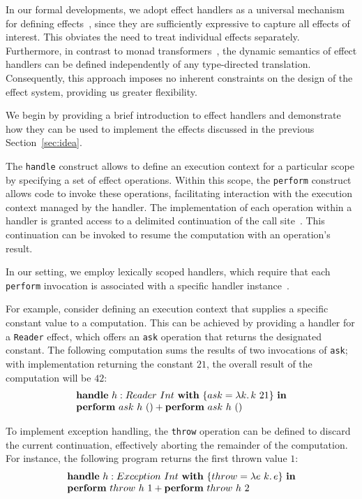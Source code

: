 \documentclass[acmsmall,review,screen]{acmart}
\newcommand{\ap}{~}
\newcommand{\keyword}[1]{\mathbf{#1}}
\begin{document}
In our formal developments, we adopt effect handlers as a universal mechanism for defining effects~\cite{plotkin2003algebraic, plotkin2013handling}, since they are sufficiently expressive to capture all effects of interest.
This obviates the need to treat individual effects separately.
Furthermore, in contrast to monad transformers~\cite{liang1995monad, schrijvers2019monad}, the dynamic semantics of effect handlers can be defined independently of any type-directed translation.
Consequently, this approach imposes no inherent constraints on the design of the effect system, providing us greater flexibility.

We begin by providing a brief introduction to effect handlers and demonstrate how they can be used to implement the effects discussed in the previous Section~\ref{sec:idea}.

The \texttt{handle} construct allows to define an execution context for a particular scope by specifying a set of effect operations.
Within this scope, the \texttt{perform} construct allows code to invoke these operations, facilitating interaction with the execution context managed by the handler.
The implementation of each operation within a handler is granted access to a delimited continuation of the call site~\cite{dyvbig2007monadic}.
This continuation can be invoked to resume the computation with an operation's result.

In our setting, we employ lexically scoped handlers, which require that each \texttt{perform} invocation is associated with a specific handler instance~\cite{biernacki2019binders, brachthauser2020effects}.

For example, consider defining an execution context that supplies a specific constant value to a computation.
This can be achieved by providing a handler for a \texttt{Reader} effect, which offers an \texttt{ask} operation that returns the designated constant.
The following computation sums the results of two invocations of \texttt{ask}; with implementation returning the constant $21$, the overall result of the computation will be $42$: %
\[
    \begin{array}{l}
        \keyword{handle} ~ h : Reader\ap Int ~\keyword{with}~ \{ ask = \lambda k\ldotp k\ap 21 \} ~\keyword{in} \\
        \keyword{perform}~ask~h~() + \keyword{perform}~ask~h~()
    \end{array}
\]

To implement exception handling, the \texttt{throw} operation can be defined to discard the current continuation, effectively aborting the remainder of the computation.
For instance, the following program returns the first thrown value $1$:
\[
    \begin{array}{l}
        \keyword{handle}~ h : Exception\ap Int ~\keyword{with}~ \{throw = \lambda e~k\ldotp e \} ~\keyword{in} \\
        \keyword{perform}~throw~h~1 + \keyword{perform}~throw~h~2
    \end{array}
\]
\end{document}
